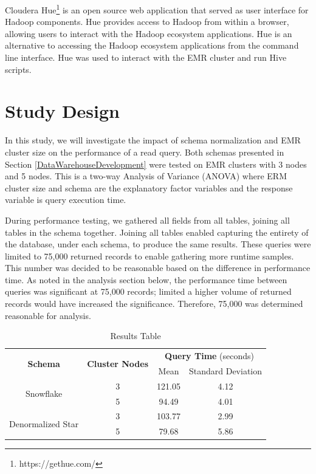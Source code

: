 \documentclass[journal]{IEEEtran}
\begin{document}
Cloudera Hue\footnote{https://gethue.com/}
 is an open source web application that served as user interface for Hadoop components.
Hue provides access to Hadoop from within a browser, allowing users to interact with the Hadoop ecosystem applications. 
Hue is an alternative to accessing the Hadoop ecosystem applications from the command line interface.
Hue was used to interact with the EMR cluster and run Hive scripts.



\section{Study Design}
\label{StudyDesign}

In this study, we will investigate the impact of schema normalization and
 EMR cluster size on the performance of a read query.
Both schemas presented in Section \ref{DataWarehouseDevelopment} were tested on
 EMR clusters with 3 nodes and 5 nodes.
This is a two-way Analysis of Variance (ANOVA) where ERM cluster size and schema
 are the explanatory factor variables and the response variable is query
 execution time.


During performance testing, we gathered all fields from all tables,
 joining all tables in the schema together. 
Joining all tables enabled capturing the entirety of the database,
 under each schema, to produce the same results. 
These queries were limited to 75,000 returned records to enable gathering more runtime samples. 
This number was decided to be reasonable based on the difference in performance time. 
As noted in the analysis section below,
 the performance time between queries was significant at 75,000 records;
 limited a higher volume of returned records would have increased the significance. 
Therefore, 75,000 was determined reasonable for analysis.


\begin{table}
	\renewcommand{\arraystretch}{1.3}
	\caption{Results Table}
	\label{ResultsTable}
	\centering
	\begin{tabular}{c c c c}
		\hline
		\hline
		\multirow{2}{*}{\textbf{Schema}} & \multirow{2}{*}{\textbf{Cluster Nodes}} &
		\multicolumn{2}{c}{\textbf{Query Time} (seconds)}   \\
		\cline{3-4}
		&     & Mean & Standard Deviation\\
		\hline
		\multirow{2}{*}{Snowflake}         & 3   & 121.05 & 4.12 \\
		
		& 5   & 94.49 & 4.01  \\
		
		\hline
		\multirow{2}{*}{Denormalized Star} & 3   & 103.77 & 2.99 \\
		
		& 5   & 79.68 & 5.86  \\
		
		\hline
		\hline
	\end{tabular}
\end{table}
\end{document}
